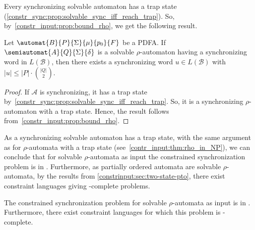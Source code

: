 

Every synchronizing solvable automaton has a trap state (\cref{constr_sync:prop:solvable_sync_iff_reach_trap}).
So, by~\cref{constr_input:prop:bound_rho},
we get the following result.

\begin{proposition}
	\label{constr_input:prop:bound_solvable}
	Let $\automat{B}{P}{\Sigma}{\mu}{p_0}{F}$ be a PDFA.
	If $\semiautomat{A}{Q}{\Sigma}{\delta}$
	is a solvable $\rho$-automaton
	having a synchronizing word in $L(\mathcal B)$,
	then there exists a synchronizing word $u \in L(\mathcal B)$
	with $|u| \le |P| \cdot \binom{|Q|}{2}$.	
\end{proposition}
\begin{proof}
	If $\mathcal A$ is synchronizing, 
	it has a trap state by~\cref{constr_sync:prop:solvable_sync_iff_reach_trap}.
	So, it is a synchronizing $\rho$-automaton
	with a trap state. 
	Hence,
	the result follows from~\cref{constr_input:prop:bound_rho}.
\end{proof}

As a synchronizing solvable automaton has a trap state,
with the same argument as for $\rho$-automata
with a trap state (see~\cref{contr_input:thm:rho_in_NP}), we can conclude that
for solvable $\rho$-automata as input the constrained synchronization
problem is in \NP. Furthermore, as partially ordered automata
are solvable $\rho$-automata, by the results from \cref{constrinput:sec:two-state-pto},
there exist constraint languages
giving \NP-complete problems.

\begin{theorem}
	\label{constr_input:thm:solvable_in_NP}
	The constrained synchronization problem
	for solvable $\rho$-automata as input
	is in \NP. Furthermore, there exist constraint languages
	for which this problem is \NP-complete.
\end{theorem}